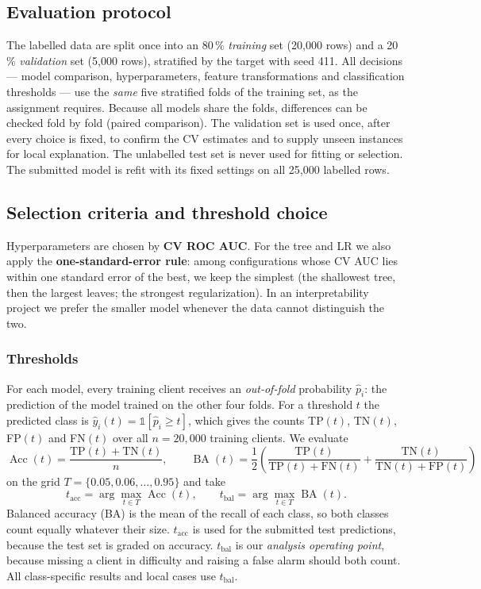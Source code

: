 \documentclass[a4paper,11pt]{article}
\begin{document}
\subsection{Evaluation protocol}
The labelled data are split once into an 80\,\% \emph{training} set (20{,}000 rows) and a 20\,\% \emph{validation} set (5{,}000 rows), stratified by the target with seed 411. All decisions --- model comparison, hyperparameters, feature transformations and classification thresholds --- use the \emph{same} five stratified folds of the training set, as the assignment requires. Because all models share the folds, differences can be checked fold by fold (paired comparison). The validation set is used once, after every choice is fixed, to confirm the CV estimates and to supply unseen instances for local explanation. The unlabelled test set is never used for fitting or selection. The submitted model is refit with its fixed settings on all 25{,}000 labelled rows.

\subsection{Selection criteria and threshold choice}
\label{sec:thresholds}
Hyperparameters are chosen by \textbf{CV ROC AUC}. For the tree and LR we also apply the \textbf{one-standard-error rule}: among configurations whose CV AUC lies within one standard error of the best, we keep the simplest (the shallowest tree, then the largest leaves; the strongest regularization). In an interpretability project we prefer the smaller model whenever the data cannot distinguish the two.

\subsubsection{Thresholds}
For each model, every training client receives an \emph{out-of-fold} probability $\hat p_i$: the prediction of the model trained on the other four folds. For a threshold $t$ the predicted class is $\hat y_i(t)=\mathbb{1}[\hat p_i \geq t]$, which gives the counts TP$(t)$, TN$(t)$, FP$(t)$ and FN$(t)$ over all $n=20{,}000$ training clients. We evaluate
\[
\operatorname{Acc}(t)=\frac{\mathrm{TP}(t)+\mathrm{TN}(t)}{n},
\qquad
\operatorname{BA}(t)=\frac{1}{2}\left(\frac{\mathrm{TP}(t)}{\mathrm{TP}(t)+\mathrm{FN}(t)}+\frac{\mathrm{TN}(t)}{\mathrm{TN}(t)+\mathrm{FP}(t)}\right)
\]
on the grid $T=\{0.05, 0.06, \dots, 0.95\}$ and take
\[
t_{\text{acc}}=\arg\max_{t\in T}\operatorname{Acc}(t),
\qquad
t_{\text{bal}}=\arg\max_{t\in T}\operatorname{BA}(t).
\]
Balanced accuracy (BA) is the mean of the recall of each class, so both classes count equally whatever their size. $t_{\text{acc}}$ is used for the submitted test predictions, because the test set is graded on accuracy. $t_{\text{bal}}$ is our \emph{analysis operating point}, because missing a client in difficulty and raising a false alarm should both count. All class-specific results and local cases use $t_{\text{bal}}$.
\end{document}
